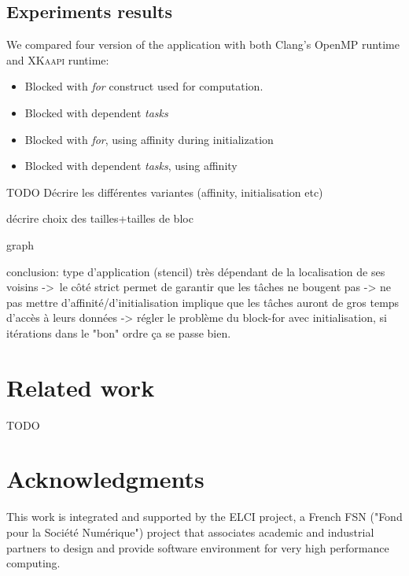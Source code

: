 \documentclass{Styles/llncs}
\newcommand{\kaapi}{\textsc{\mbox{XKaapi}}\xspace}
\begin{document}
\subsection{Experiments results}

We compared four version of the application with both Clang's OpenMP runtime
and \kaapi runtime:

\begin{itemize}
  \item Blocked with \emph{for} construct used for computation.
  \item Blocked with dependent \emph{tasks}
  \item Blocked with \emph{for}, using affinity during initialization
  \item Blocked with dependent \emph{tasks}, using affinity
\end{itemize}

TODO Décrire les différentes variantes
(affinity, initialisation etc)

décrire choix des tailles+tailles de bloc

graph

conclusion: type d'application (stencil) très dépendant de la localisation de ses voisins
-> le côté strict permet de garantir que les tâches ne bougent pas
-> ne pas mettre d'affinité/d'initialisation implique que les tâches auront de gros temps d'accès à leurs données
-> régler le problème du block-for avec initialisation, si itérations dans le "bon" ordre ça se passe bien.

\section{Related work}

TODO


\section*{Acknowledgments}


This work is integrated and supported by the ELCI  project, a French FSN ("Fond pour la Société Numérique")
project that associates academic and industrial partners to design and provide software environment for very high performance
computing.
  \small 

\end{document}
